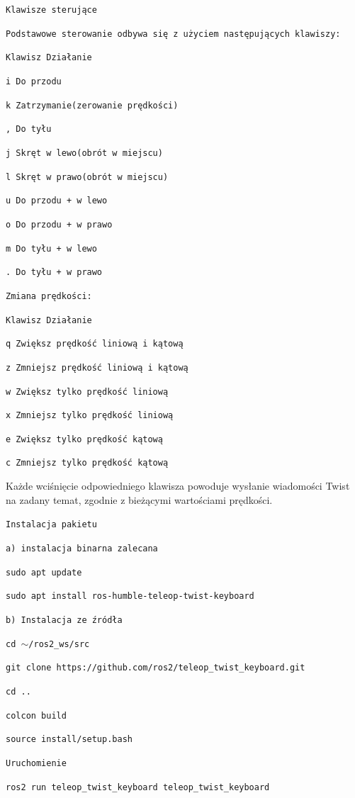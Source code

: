 \documentclass[12pt]{article}
\begin{document}
\texttt{Klawisze sterujące}

\texttt{Podstawowe sterowanie odbywa się z użyciem następujących klawiszy:}

\texttt{Klawisz  Działanie}

\texttt{i  Do przodu}

\texttt{k  Zatrzymanie(zerowanie prędkości)}

\texttt{,  Do tyłu}

\texttt{j  Skręt w lewo(obrót w miejscu)}

\texttt{l  Skręt w prawo(obrót w miejscu)}

\texttt{u Do przodu + w lewo}

\texttt{o  Do przodu + w prawo}

\texttt{m  Do tyłu + w lewo}

\texttt{.  Do tyłu + w prawo}

\texttt{Zmiana prędkości:}

\texttt{Klawisz  Działanie}

\texttt{q  Zwiększ prędkość liniową i kątową}

\texttt{z  Zmniejsz prędkość liniową i kątową}

\texttt{w  Zwiększ tylko prędkość liniową}

\texttt{x  Zmniejsz tylko prędkość liniową}

\texttt{e  Zwiększ tylko prędkość kątową}

\texttt{c  Zmniejsz tylko prędkość kątową}

Każde wciśnięcie odpowiedniego klawisza powoduje wysłanie wiadomości Twist na zadany temat, zgodnie z bieżącymi wartościami prędkości.

\texttt{Instalacja pakietu}

\texttt{a) instalacja binarna zalecana}

\texttt{sudo apt update}

\texttt{sudo apt install ros-humble-teleop-twist-keyboard}

\texttt{b) Instalacja ze źródła}

\texttt{cd $\sim$/ros2\_ws/src}

\texttt{git clone https://github.com/ros2/teleop\_twist\_keyboard.git}

\texttt{cd ..}

\texttt{colcon build}

\texttt{source install/setup.bash}

\texttt{Uruchomienie}

\texttt{ros2 run teleop\_twist\_keyboard teleop\_twist\_keyboard}
\end{document}
